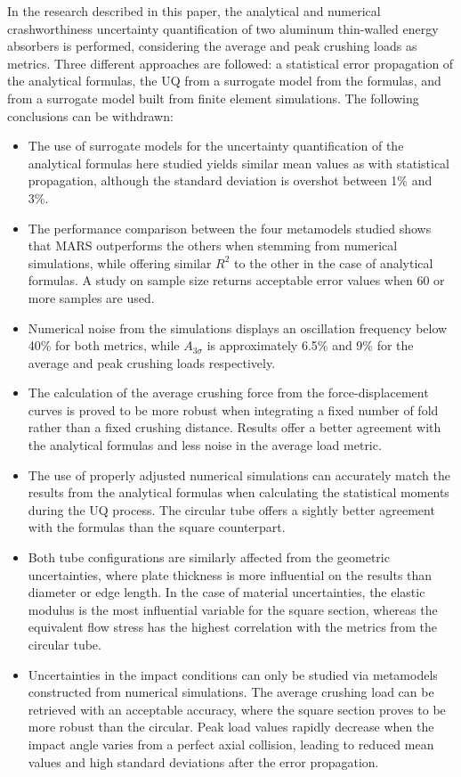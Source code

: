 \documentclass[12pt,number,preprint,review,times]{elsarticle}
\begin{document}
In the research described in this paper, the analytical and numerical crashworthiness uncertainty quantification of two aluminum thin-walled energy absorbers is performed, considering the average and peak crushing loads as metrics. Three different approaches are followed: a statistical error propagation of the analytical formulas, the UQ from a surrogate model from the formulas, and from a surrogate model built from finite element simulations. The following conclusions can be withdrawn:

\begin{itemize}
    \item The use of surrogate models for the uncertainty quantification of the analytical formulas here studied yields similar mean values as with statistical propagation, although the standard deviation is overshot between 1\% and 3\%.
    \item The performance comparison between the four metamodels studied shows that MARS outperforms the others when stemming from numerical simulations, while offering similar $R^2$ to the other in the case of analytical formulas. A study on sample size returns acceptable error values when 60 or more samples are used.
    \item Numerical noise from the simulations displays an oscillation frequency below 40\% for both metrics, while $A_{3 \sigma}$ is approximately 6.5\% and 9\% for the average and peak crushing loads respectively.
    \item The calculation of the average crushing force from the force-displacement curves is proved to be more robust when integrating a fixed number of fold rather than a fixed crushing distance. Results offer a better agreement with the analytical formulas and less noise in the average load metric.
    \item The use of properly adjusted numerical simulations can accurately match the results from the analytical formulas when calculating the statistical moments during the UQ process. The circular tube offers a sightly better agreement with the formulas than the square counterpart.
    \item Both tube configurations are similarly affected from the geometric uncertainties, where plate thickness is more influential on the results than diameter or edge length. In the case of material uncertainties, the elastic modulus is the most influential variable for the square section, whereas the equivalent flow stress has the highest correlation with the metrics from the circular tube.
    \item Uncertainties in the impact conditions can only be studied via metamodels constructed from numerical simulations. The average crushing load can be retrieved with an acceptable accuracy, where the square section proves to be more robust than the circular. Peak load values rapidly decrease when the impact angle varies from a perfect axial collision, leading to reduced mean values and high standard deviations after the error propagation.
\end{itemize}
\end{document}
